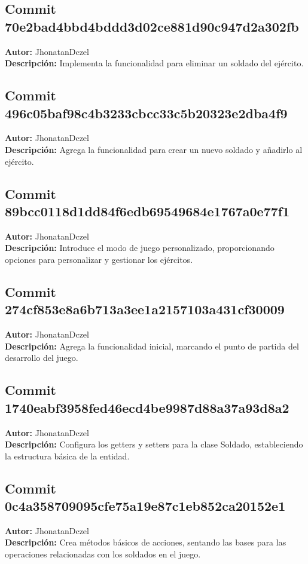 \subsection*{Commit 70e2bad4bbd4bddd3d02ce881d90c947d2a302fb}
\textbf{Autor:} JhonatanDczel \\
\textbf{Descripción:} Implementa la funcionalidad para eliminar un soldado del ejército.

\subsection*{Commit 496c05baf98c4b3233cbcc33c5b20323e2dba4f9}
\textbf{Autor:} JhonatanDczel \\
\textbf{Descripción:} Agrega la funcionalidad para crear un nuevo soldado y añadirlo al ejército.

\subsection*{Commit 89bcc0118d1dd84f6edb69549684e1767a0e77f1}
\textbf{Autor:} JhonatanDczel \\
\textbf{Descripción:} Introduce el modo de juego personalizado, proporcionando opciones para personalizar y gestionar los ejércitos.

\subsection*{Commit 274cf853e8a6b713a3ee1a2157103a431cf30009}
\textbf{Autor:} JhonatanDczel \\
\textbf{Descripción:} Agrega la funcionalidad inicial, marcando el punto de partida del desarrollo del juego.

\subsection*{Commit 1740eabf3958fed46ecd4be9987d88a37a93d8a2}
\textbf{Autor:} JhonatanDczel \\
\textbf{Descripción:} Configura los getters y setters para la clase Soldado, estableciendo la estructura básica de la entidad.

\subsection*{Commit 0c4a358709095cfe75a19e87c1eb852ca20152e1}
\textbf{Autor:} JhonatanDczel \\
\textbf{Descripción:} Crea métodos básicos de acciones, sentando las bases para las operaciones relacionadas con los soldados en el juego.

